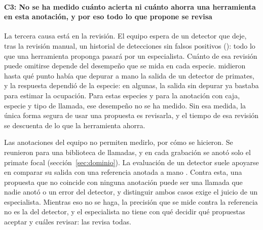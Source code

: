 \paragraph{C3: No se ha medido cuánto acierta ni cuánto ahorra una herramienta en
    esta anotación, y por eso todo lo que propone se revisa}
La tercera causa está en la revisión. El equipo espera de un detector que deje,
tras la revisión manual, un historial de detecciones sin falsos positivos
(\cpEquipo): todo lo que una herramienta proponga pasará por un especialista.
Cuánto de esa revisión puede omitirse depende del desempeño que se mida en cada
especie. \citet{kalan_towards_2015} midieron hasta qué punto había que depurar a
mano la salida de un detector de primates, y la respuesta dependió de la especie:
en algunas, la salida sin depurar ya bastaba para estimar la ocupación. Para estas
especies y para la anotación con caja, especie y tipo de llamada, ese desempeño no
se ha medido. Sin esa medida, la única forma segura de usar una propuesta es
revisarla, y el tiempo de esa revisión se descuenta de lo que la herramienta
ahorra.

Las anotaciones del equipo no permiten medirlo, por cómo se hicieron. Se
reunieron para una biblioteca de llamadas, y en cada grabación se anotó solo el
primate focal (sección~\ref{sec:dominio}). La evaluación de un detector suele
apoyarse en comparar su salida con una referencia anotada a mano
\citep{leroy_reliability_2018}. Contra esta, una propuesta que no coincide con
ninguna anotación puede ser una llamada que nadie anotó o un error del detector,
y distinguir ambos casos exige el juicio de un especialista. Mientras eso no se
haga, la precisión que se mide contra la referencia no es la del detector, y el
especialista no tiene con qué decidir qué propuestas aceptar y cuáles revisar:
las revisa todas.

